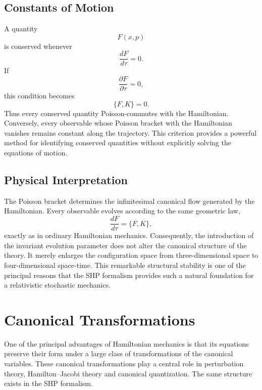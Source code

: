 \subsection{Constants of Motion}
A quantity
\[F(x,p)\]
is conserved whenever
\[\frac{dF}{d\tau}=0.\]
If
\[\frac{\partial F}{\partial\tau}=0,\]
this condition becomes
\[\boxed{\{F,K\}=0.}\]
Thus every conserved quantity Poisson-commutes with the Hamiltonian.
Conversely, every observable whose Poisson bracket with the Hamiltonian
vanishes remains constant along the trajectory.
This criterion provides a powerful method for identifying conserved
quantities without explicitly solving the equations of motion.
\subsection{Physical Interpretation}
The Poisson bracket determines the infinitesimal canonical flow
generated by the Hamiltonian. Every observable evolves according to the
same geometric law,
\[\frac{dF}{d\tau}=\{F,K\},\]
exactly as in ordinary Hamiltonian mechanics.
Consequently, the introduction of the invariant evolution parameter does
not alter the canonical structure of the theory. It merely enlarges the
configuration space from three-dimensional space to four-dimensional
space-time.
This remarkable structural stability is one of the principal reasons
that the SHP formalism provides such a natural foundation for a
relativistic stochastic mechanics.
\section{Canonical Transformations}
One of the principal advantages of Hamiltonian mechanics is that its
equations preserve their form under a large class of transformations of
the canonical variables. These canonical transformations play a central
role in perturbation theory, Hamilton--Jacobi theory and canonical
quantization.
The same structure exists in the SHP formalism.
